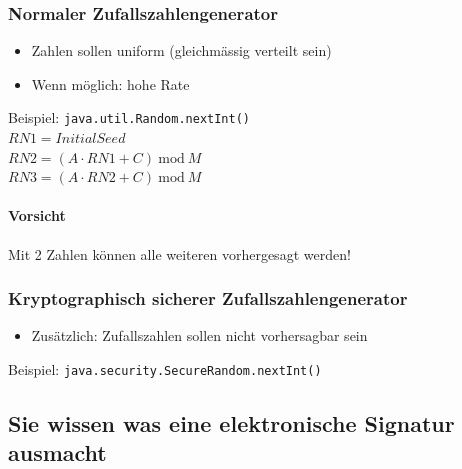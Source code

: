 \documentclass[10pt,a4paper]{article}
\begin{document}
\begin{multicols}{2}
    \subsubsection*{Normaler Zufallszahlengenerator}
    \begin{itemize}[noitemsep,topsep=0pt,leftmargin=*]
        \item Zahlen sollen uniform (gleichmässig verteilt sein)
        \item Wenn möglich: hohe Rate
    \end{itemize}
    Beispiel: \texttt{java.util.Random.nextInt()}\\
    $RN1 = InitialSeed$\\
    $RN2=(A\cdot RN1+C)\ \mathrm{mod}\ M$\\
    $RN3=(A\cdot RN2+C)\ \mathrm{mod}\ M$
    \paragraph*{Vorsicht}Mit 2 Zahlen können alle weiteren vorhergesagt werden!\\\vspace*{\fill}
    \columnbreak
    \subsubsection*{Kryptographisch sicherer Zufallszahlengenerator}
    \begin{itemize}[noitemsep,topsep=0pt,leftmargin=*]
        \item Zusätzlich: Zufallszahlen sollen nicht vorhersagbar sein
    \end{itemize}
    Beispiel: \texttt{java.security.SecureRandom.nextInt()}
\end{multicols}

\subsection*{Sie wissen was eine elektronische Signatur ausmacht}
\end{document}
